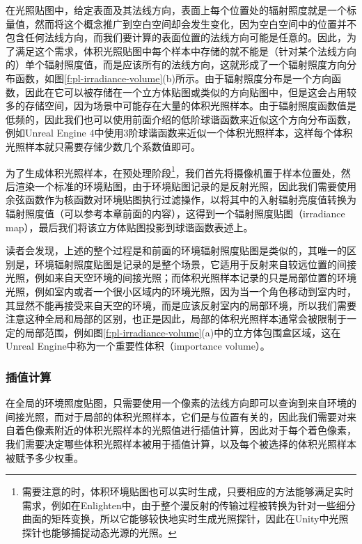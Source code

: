 在光照贴图中，给定表面及其法线方向，表面上每个位置处的辐射照度就是一个标量值，然而将这个概念推广到空白空间却会发生变化，因为空白空间中的位置并不包含任何法线方向，而我们要计算的表面位置的法线方向可能是任意的。因此，为了满足这个需求，体积光照贴图中每个样本中存储的就不能是（针对某个法线方向的）单个辐射照度值，而是应该所有的法线方向，这就形成了一个辐射照度方向分布函数，如图\ref{f:pl-irradiance-volume}(b)所示。由于辐射照度分布是一个方向函数，因此在它可以被存储在一个立方体贴图或类似的方向贴图中，但是这会占用较多的存储空间，因为场景中可能存在大量的体积光照样本。由于辐射照度函数值是低频的，因此我们也可以使用前面介绍的低阶球谐函数来近似这个方向分布函数，例如Unreal Engine 4中使用3阶球谐函数来近似一个体积光照样本，这样每个体积光照样本就只需要存储少数几个系数值即可。

为了生成体积光照样本，在预处理阶段\footnote{需要注意的时，体积环境贴图也可以实时生成，只要相应的方法能够满足实时需求，例如在Enlighten中，由于整个漫反射的传输过程被转换为针对一些细分曲面的矩阵变换，所以它能够较快地实时生成光照探针，因此在Unity中光照探针也能够捕捉动态光源的光照。}，我们首先将摄像机置于样本位置处，然后渲染一个标准的环境贴图，由于环境贴图记录的是反射光照，因此我们需要使用余弦函数作为核函数对环境贴图执行过滤操作，以将其中的入射辐射亮度值转换为辐射照度值（可以参考本章前面的内容），这得到一个辐射照度贴图（irradiance map），最后我们将该立方体贴图投影到球谐函数表述上。

读者会发现，上述的整个过程是和前面的环境辐射照度贴图是类似的，其唯一的区别是，环境辐射照度贴图是记录的是整个场景，它适用于反射来自较远位置的间接光照，例如来自天空环境的间接光照；而体积光照样本记录的只是局部位置的环境光照，例如室内或者一个很小区域内的环境光照，因为当一个角色移动到室内时，其显然不能再接受来自天空的环境，而是应该反射室内的局部环境，所以我们需要注意这种全局和局部的区别，也正是因此，局部的体积光照样本通常会被限制于一定的局部范围，例如图\ref{f:pl-irradiance-volume}(a)中的立方体包围盒区域，这在Unreal Engine中称为一个重要性体积（importance volume）。



\subsubsection{插值计算}
在全局的环境照度贴图，只需要使用一个像素的法线方向即可以查询到来自环境的间接光照，而对于局部的体积光照样本，它们是与位置有关的，因此我们需要对来自着色像素附近的体积光照样本的光照值进行插值计算，因此对于每个着色像素，我们需要决定哪些体积光照样本被用于插值计算，以及每个被选择的体积光照样本被赋予多少权重。

